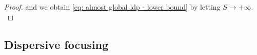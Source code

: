 \documentclass[a4paper,10pt,reqno]{article}
\theoremstyle{definition}
\theoremstyle{plain}
\theoremstyle{plain}
\theoremstyle{definition}
\theoremstyle{plain}
\theoremstyle{plain}
\theoremstyle{plain}
\theoremstyle{definition}
\theoremstyle{definition}
\newcommand{\norm}[1]{\left\lVert #1 \right\rVert}
\def \N{\mathbb N}
\def \P{{\mathbb P}}
\def \T{\mathbb{T}}
\begin{document}
\begin{proof}
and we obtain \eqref{eq: almost global ldp - lower bound} by letting $S \to +\infty.$
\end{proof}

\smallskip

\subsection{Dispersive focusing} \label{subsection: dispersive focusing}
\end{document}
